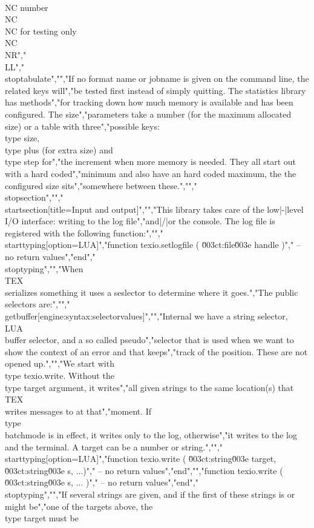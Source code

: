      \\NC number       \\NC          \\NC for testing only \\NC \\NR","\\LL","\\stoptabulate","","If no format name or jobname is given on the command line, the related keys will","be tested first instead of simply quitting. The statistics library has methods","for tracking down how much memory is available and has been configured. The size","parameters take a number (for the maximum allocated size) or a table with three","possible keys: \\type {size}, \\type {plus} (for extra size) and \\type {step} for","the increment when more memory is needed. They all start out with a hard coded","minimum and also have an hard coded maximum, the the configured size sits","somewhere between these.","","\\stopsection","","\\startsection[title={Input and output}]","","This library takes care of the low|-|level I/O interface: writing to the log file","and|/|or the console. The log file is registered with the following function:","","\\starttyping[option=LUA]","function texio.setlogfile ( \u003ct:file\u003e handle )","    -- no return values","end","\\stoptyping","","When \\TEX\\ serializes something it uses a seslector to determine where it goes.","The public selectors are:","","\\getbuffer[engine:syntax:selectorvalues]","","Internal we have a string selector, \\LUA\\ buffer selector, and a so called pseudo","selector that is used when we want to show the context of an error and that keeps","track of the position. These are not opened up.","","We start with \\type {texio.write}. Without the \\type {target} argument, it writes","all given strings to the same location(s) that \\TEX\\ writes messages to at that","moment. If \\type {\\batchmode} is in effect, it writes only to the log, otherwise","it writes to the log and the terminal. A target can be a number or string.","","\\starttyping[option=LUA]","function texio.write ( \u003ct:string\u003e target, \u003ct:string\u003e s, ...)","    -- no return values","end","","function texio.write ( \u003ct:string\u003e s, ... )","    -- no return values","end","\\stoptyping","","If several strings are given, and if the first of these strings is or might be","one of the targets above, the \\type {target} must be 